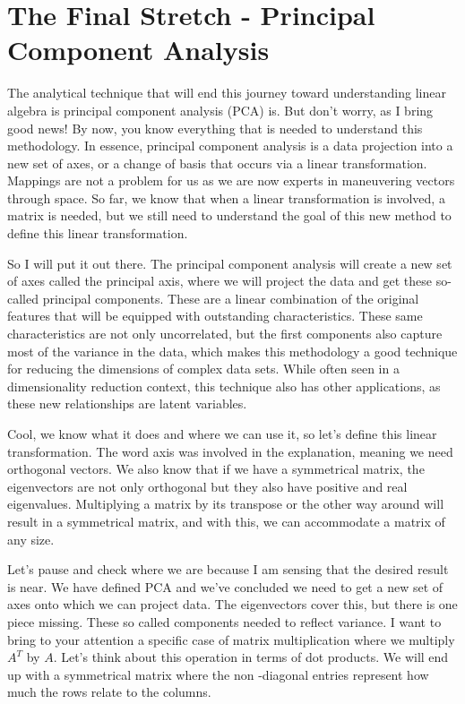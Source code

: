 \documentclass[a4,12pt,twosided,openany]{memoir}
\begin{document}
\chapter{The Final Stretch - Principal Component Analysis}
\par 
\indent
The analytical technique that will end this journey toward understanding linear algebra is principal component analysis (PCA) is. But don’t worry, as I bring good news! By now, you know everything that is needed to understand this methodology. In essence, principal component analysis is a data projection into a new set of axes, or a change of basis that occurs via a linear transformation. Mappings are not a problem for us as we are now experts in maneuvering vectors through space. So far, we know that when a linear transformation is involved, a matrix is needed, but we still need to understand the goal of this new method to define this linear transformation. 
\par 
\indent
So I will put it out there. The principal component analysis will create a new set of axes called the principal axis, where we will project the data and get these so-called principal components. These are a linear combination of the original features that will be equipped with outstanding characteristics. These same characteristics are not only uncorrelated, but the first components also capture most of the variance in the data, which makes this methodology a good technique for reducing the dimensions of complex data sets. While often seen in a dimensionality reduction context, this technique also has other applications, as these new relationships are latent variables.
\par 
\indent
Cool, we know what it does and where we can use it, so let’s define this linear transformation. The word axis was involved in the explanation, meaning we need orthogonal vectors. We also know that if we have a symmetrical matrix, the eigenvectors are not only orthogonal but they also have positive and real eigenvalues. Multiplying a matrix by its transpose or the other way around will result in a symmetrical matrix, and with this, we can accommodate a matrix of any size. 
\par 
\indent
Let’s pause and check where we are because I am sensing that the desired result is near. We have defined PCA and we’ve concluded we need to get a new set of axes onto which we can project data. The eigenvectors cover this, but there is one piece missing. These so called components needed to reflect variance. I want to bring to your attention a specific case of matrix multiplication where we multiply $A^T$ by $A$. Let’s think about this operation in terms of dot products. We will end up with a symmetrical matrix where the non -diagonal entries represent how much the rows relate to the columns. 
\end{document}
